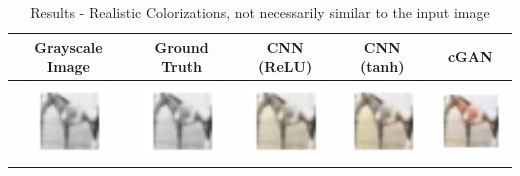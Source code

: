 \documentclass{article}
\begin{document}
\begin{table}[h!]
  \caption{Results - Realistic Colorizations, not necessarily similar to the input image}
  \label{tab:3}
  \centering
  \begin{tabular}{ccccc}
    \toprule
    Grayscale Image & Ground Truth & CNN (ReLU) & CNN (tanh) & cGAN \\
    \midrule
    \includegraphics[width=2cm]{results3/83-bw.png} & \includegraphics[width=2cm]{results3/83-gt.png} & \includegraphics[width=2cm]{results5/83-relucnn.png} & \includegraphics[width=2cm]{results5/83-tanhcnn.png} & \includegraphics[width=2cm]{results3/83-gan.png} \\

\end{tabular}
\end{table}
\end{document}
